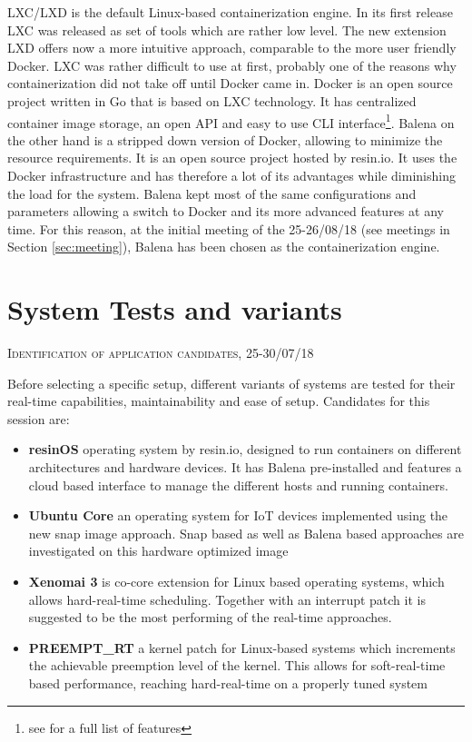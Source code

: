 \documentclass[]{scrartcl}
\begin{document}
LXC/LXD is the default Linux-based containerization engine. In its first release LXC was released as set of tools which are rather low level. The new extension LXD offers now a more intuitive approach, comparable to the more user friendly Docker. LXC was rather difficult to use at first, probably one of the reasons why containerization did not take off until Docker came in. Docker is an open source project written in Go that is based on LXC technology. It has centralized container image storage, an open API and easy to use CLI interface\footnote{see \cite{docker01} for a full list of features}. Balena on the other hand is a stripped down version of Docker, allowing to minimize the resource requirements. It is an open source project hosted by resin.io. It uses the Docker infrastructure and has therefore a lot of its advantages while diminishing the load for the system. Balena kept most of the same configurations and parameters allowing a switch to Docker and its more advanced features at any time. For this reason, at the initial meeting of the 25-26/08/18 (see meetings in Section \ref{sec:meeting}), Balena has been chosen as the containerization engine. 

\section{System Tests and variants}

{\small\textsc{Identification of application candidates, 25-30/07/18} \bigskip}

Before selecting a specific setup, different variants of systems are tested for their real-time capabilities, maintainability and ease of setup. Candidates for this session are:

\begin{itemize}
	\item \textbf{resinOS} operating system by resin.io, designed to run containers on different architectures and hardware devices. It has Balena pre-installed and features a cloud based interface to manage the different hosts and running containers.
	\item \textbf{Ubuntu Core} an operating system for IoT devices implemented using the new snap image approach. Snap based as well as Balena based approaches are investigated on this hardware optimized image
	\item \textbf{Xenomai 3} is co-core extension for Linux based operating systems, which allows hard-real-time scheduling. Together with an interrupt patch it is suggested to be the most performing of the real-time approaches.
	\item \textbf{PREEMPT\_RT} a kernel patch for Linux-based systems which increments the achievable preemption level of the kernel. This allows for soft-real-time based performance, reaching hard-real-time on a properly tuned system
\end{itemize}
\end{document}
